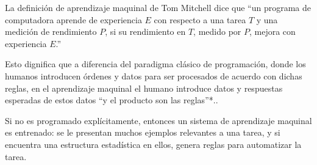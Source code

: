 La definición de aprendizaje maquinal de Tom Mitchell\cite{mich19} dice que ``un programa de computadora aprende de experiencia $E$ con respecto a una tarea $T$ y una medición de rendimiento $P$, si su rendimiento en $T$, medido por $P$, mejora con experiencia $E$.''

Esto dignifica que a diferencia del paradigma clásico de programación, donde los humanos introducen órdenes y datos para ser procesados de acuerdo con dichas reglas, en el aprendizaje maquinal el humano introduce datos y respuestas esperadas de estos datos ``y el producto son las reglas''*..

Si no es programado explícitamente, entonces un sistema de aprendizaje maquinal es entrenado: se le presentan muchos ejemplos relevantes a una tarea, y si encuentra una estructura estadística en ellos, genera reglas para automatizar la tarea.